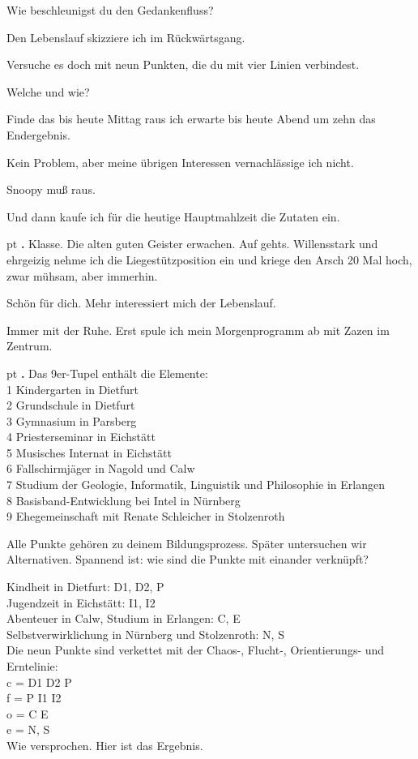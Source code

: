 \documentclass[10pt,a4paper]{article}
\newcounter{notec}
\newcommand\notep[1]{%
  \stepcounter{notec}
  \vskip #1pt
  {\bf\arabic{notec}.}
}
\begin{document}
\begin{mdframed}[style=daystyle]
  \vskip 2pt
  Wie beschleunigst du den Gedankenfluss?

  \vskip 2pt
  Den Lebenslauf skizziere ich im Rückwärtsgang.

  \vskip 2pt
  Versuche es doch mit neun Punkten, die du mit vier Linien verbindest.

  \vskip 2pt
  Welche und wie?

  \vskip 2pt
  Finde das bis heute Mittag raus ich erwarte bis heute Abend um zehn das Endergebnis.

  \vskip 2pt
  Kein Problem, aber meine übrigen Interessen vernachlässige ich nicht.

  \vskip 2pt
  Snoopy muß raus.

  \vskip 2pt
  Und dann kaufe ich für die heutige Hauptmahlzeit die Zutaten ein.

  
  \notep 4 Klasse. Die alten guten Geister erwachen. Auf gehts. Willensstark und
  ehrgeizig nehme ich die Liegestützposition ein und kriege den Arsch 20 Mal
  hoch, zwar mühsam, aber immerhin.

  \vskip 2pt
  Schön für dich. Mehr interessiert mich der Lebenslauf.

  \vskip 2pt
  Immer mit der Ruhe. Erst spule ich mein Morgenprogramm ab mit Zazen im Zentrum.


  \notep 4 Das 9er-Tupel enthält die Elemente: \\
  1 Kindergarten in Dietfurt \\
  2 Grundschule in Dietfurt \\
  3 Gymnasium in Parsberg \\
  4 Priesterseminar in Eichstätt \\
  5 Musisches Internat in Eichstätt \\
  6 Fallschirmjäger in Nagold und Calw \\
  7 Studium der Geologie, Informatik, Linguistik und Philosophie in Erlangen \\
  8 Basisband-Entwicklung bei Intel in Nürnberg \\
  9 Ehegemeinschaft mit Renate Schleicher in Stolzenroth 

  \vskip 2pt
  Alle Punkte gehören zu deinem Bildungsprozess. Später untersuchen wir
  Alternativen. Spannend ist: wie sind die Punkte mit einander verknüpft?

  \vskip 2pt
  Kindheit in Dietfurt: D1, D2, P \\
  Jugendzeit in Eichstätt: I1, I2 \\
  Abenteuer in Calw, Studium in Erlangen: C, E \\
  Selbstverwirklichung in Nürnberg und Stolzenroth: N, S \\
  Die neun Punkte sind verkettet mit der Chaos-, Flucht-, Orientierungs- und Erntelinie: \\
  c = D1 D2 P \\
  f = P I1 I2 \\
  o = C E \\
  e = N, S \\
  Wie versprochen. Hier ist das Ergebnis.


\end{mdframed}
\end{document}
